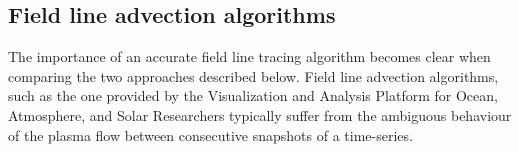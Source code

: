 \documentclass{aa}
\begin{document}

\subsection{Field line advection algorithms}\label{section_vapor}

The importance of an accurate field line tracing algorithm becomes clear when comparing the two approaches described below. 
Field line advection algorithms, such as the one provided by the Visualization and Analysis Platform for Ocean, Atmosphere, and Solar Researchers \citep[VAPOR,][]{clyne:2005, clyne:2007} typically suffer from the ambiguous behaviour of the plasma flow between consecutive snapshots of a time-series. %
\end{document}
